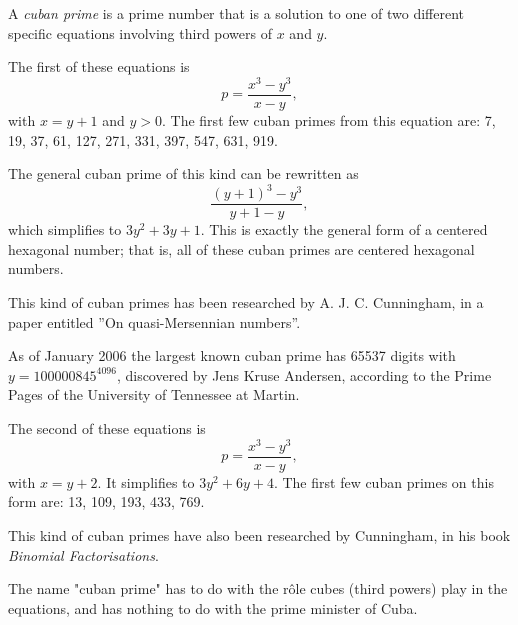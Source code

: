 \documentclass[12pt]{article}
\begin{document}
A {\em cuban prime} is a prime number that is a solution to one of two different specific equations involving third powers of $x$ and $y$.

The first of these equations is $$p = \frac{x^3 - y^3}{x - y},$$ with $x = y + 1$ and $y > 0$. The first few cuban primes from this equation are: 7, 19, 37, 61, 127, 271, 331, 397, 547, 631, 919.

The general cuban prime of this kind can be rewritten as $$\frac{(y + 1)^3 - y^3}{y + 1 - y},$$ which simplifies to $3y^2 + 3y + 1$. This is exactly the general form of a centered hexagonal number; that is, all of these cuban primes are centered hexagonal numbers.  

This kind of cuban primes has been researched by A. J. C. Cunningham, in a paper entitled ''On quasi-Mersennian numbers''.

As of January 2006 the largest known cuban prime has 65537 digits with $y = 100000845^{4096}$, discovered by Jens Kruse Andersen, according to the Prime Pages of the University of Tennessee at Martin.

The second of these equations is $$p = \frac{x^3 - y^3}{x - y},$$ with $x = y + 2$. It simplifies to $3y^2 + 6y + 4$. The first few cuban primes on this form are: 13, 109, 193, 433, 769.

This kind of cuban primes have also been researched by Cunningham, in his book {\it Binomial Factorisations}.

The name "cuban prime" has to do with the r\^ole cubes (third powers) play in the equations, and has nothing to do with the prime minister of Cuba.
\end{document}
